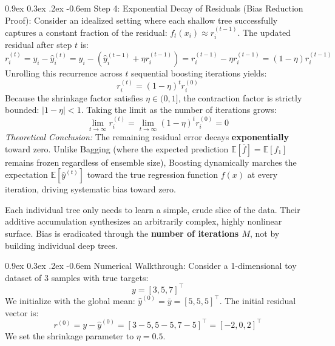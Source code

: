 \documentclass[11pt,a4paper]{article}
\makeatletter
\renewcommand\paragraph{\@startsection{paragraph}{4}{\z@}%
                                     {0.9ex \@plus0.3ex \@minus.2ex}%
                                     {-0.6em}%
                                     {\normalfont\normalsize\bfseries}}
\newcommand{\E}{\mathbb{E}}
\makeatother
\begin{document}
\paragraph{Step 4: Exponential Decay of Residuals (Bias Reduction Proof):}
Consider an idealized setting where each shallow tree successfully captures a constant fraction of the residual: $f_t(x_i) \approx r_i^{(t-1)}$. The updated residual after step $t$ is:
\begin{equation}
    r_i^{(t)} = y_i - \hat{y}_i^{(t)} = y_i - \left( \hat{y}_i^{(t-1)} + \eta r_i^{(t-1)} \right) = r_i^{(t-1)} - \eta r_i^{(t-1)} = (1 - \eta) r_i^{(t-1)}
\end{equation}
Unrolling this recurrence across $t$ sequential boosting iterations yields:
\begin{equation}
    r_i^{(t)} = (1 - \eta)^t r_i^{(0)}
\end{equation}
Because the shrinkage factor satisfies $\eta \in (0, 1]$, the contraction factor is strictly bounded: $|1 - \eta| < 1$. Taking the limit as the number of iterations grows:
\begin{equation}
    \lim_{t \to \infty} r_i^{(t)} = \lim_{t \to \infty} (1 - \eta)^t r_i^{(0)} = 0
\end{equation}
\emph{Theoretical Conclusion:} The remaining residual error decays \textbf{exponentially} toward zero. Unlike Bagging (where the expected prediction $\E[\bar{f}] = \E[f_1]$ remains frozen regardless of ensemble size), Boosting dynamically marches the expectation $\E[\hat{y}^{(t)}]$ toward the true regression function $f(x)$ at every iteration, driving systematic bias toward zero.

Each individual tree only needs to learn a simple, crude slice of the data. Their additive accumulation synthesizes an arbitrarily complex, highly nonlinear surface. Bias is eradicated through the \textbf{number of iterations $M$}, not by building individual deep trees.

\paragraph{Numerical Walkthrough:}
Consider a 1-dimensional toy dataset of 3 samples with true targets:
\begin{equation*}
    y = [3, 5, 7]^\top
\end{equation*}
We initialize with the global mean: $\hat{y}^{(0)} = \bar{y} = [5, 5, 5]^\top$. 
The initial residual vector is:
\begin{equation*}
    r^{(0)} = y - \hat{y}^{(0)} = [3-5, 5-5, 7-5]^\top = [-2, 0, 2]^\top
\end{equation*}
We set the shrinkage parameter to $\eta = 0.5$.
\end{document}
